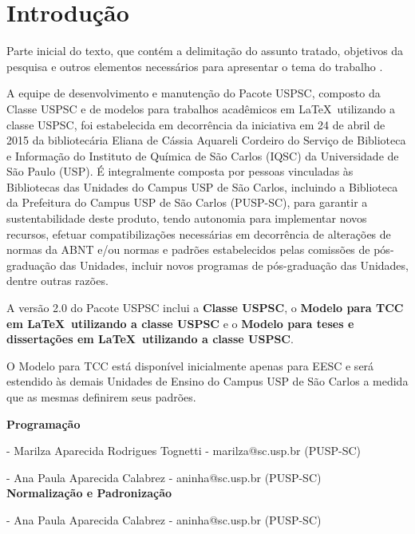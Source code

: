 
\chapter[Introdução]{Introdução}


Parte inicial do texto, que contém a delimitação do assunto tratado, objetivos da pesquisa e outros elementos necessários para apresentar o tema do trabalho \cite{sibi2016}.

A equipe de desenvolvimento e manutenção do Pacote USPSC, composto da Classe USPSC e de modelos para trabalhos acadêmicos em \LaTeX\ utilizando a classe USPSC, foi estabelecida em decorrência da iniciativa em 24 de abril de 2015 da bibliotecária Eliana de Cássia Aquareli Cordeiro do Serviço de Biblioteca e Informação do Instituto de Química de São Carlos (IQSC) da Universidade de São Paulo (USP). É integralmente composta por pessoas vinculadas às Bibliotecas das Unidades do Campus USP de São Carlos, incluindo a Biblioteca da Prefeitura do Campus USP de São Carlos (PUSP-SC), para garantir a sustentabilidade deste produto, tendo autonomia para implementar novos recursos, efetuar compatibilizações necessárias em decorrência de alterações de normas da ABNT e/ou normas e padrões estabelecidos pelas comissões de pós-graduação das Unidades, incluir novos programas de pós-graduação das Unidades, dentre outras razões. 

A versão 2.0 do Pacote USPSC inclui a \textbf{Classe USPSC}, o \textbf{Modelo para TCC em \LaTeX\ utilizando a classe USPSC} e o \textbf{Modelo para teses e dissertações em \LaTeX\ utilizando a classe USPSC}.

O Modelo para TCC está disponível inicialmente apenas para EESC e será estendido às demais Unidades de Ensino do Campus USP de São Carlos a medida que as mesmas definirem seus padrões.

\textbf{Programação}

  - Marilza Aparecida Rodrigues Tognetti - marilza@sc.usp.br (PUSP-SC)
		
  - Ana Paula Aparecida Calabrez - aninha@sc.usp.br (PUSP-SC) \\
	
	
\textbf{Normalização e Padronização}

   - Ana Paula Aparecida Calabrez - aninha@sc.usp.br (PUSP-SC)
	
